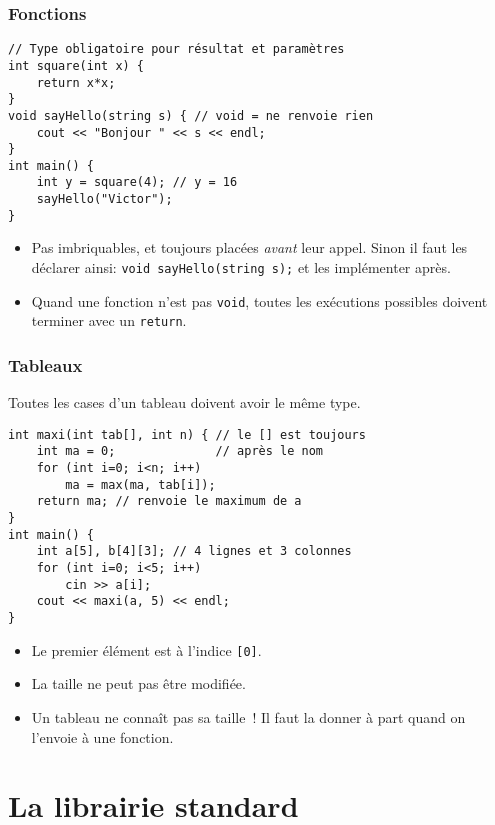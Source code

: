 \documentclass[12pt]{beamer}
\begin{document}
\begin{frame}[fragile]
\frametitle{Fonctions}
\begin{lstlisting}
// Type obligatoire pour résultat et paramètres
int square(int x) {
    return x*x;
}
void sayHello(string s) { // void = ne renvoie rien
    cout << "Bonjour " << s << endl;
}
int main() {
    int y = square(4); // y = 16
    sayHello("Victor");
}
\end{lstlisting}
\begin{itemize}
\item Pas imbriquables, et toujours placées \emph{avant} leur appel. Sinon il faut les déclarer ainsi: \lstinline|void sayHello(string s);| et les implémenter après.
\item Quand une fonction n'est pas \lstinline|void|, toutes les exécutions possibles doivent terminer avec un \lstinline|return|.
\end{itemize}
\end{frame}

\begin{frame}[fragile]
\frametitle{Tableaux}
Toutes les cases d'un tableau doivent avoir le même type.
\begin{lstlisting}
int maxi(int tab[], int n) { // le [] est toujours
    int ma = 0;              // après le nom
    for (int i=0; i<n; i++)
        ma = max(ma, tab[i]);
    return ma; // renvoie le maximum de a
}
int main() {
    int a[5], b[4][3]; // 4 lignes et 3 colonnes
    for (int i=0; i<5; i++)
        cin >> a[i];
    cout << maxi(a, 5) << endl;
}
\end{lstlisting}
\begin{itemize}
\item Le premier élément est à l'indice \lstinline|[0]|.
\item La taille ne peut pas être modifiée.
\item Un tableau ne connaît pas sa taille ! Il faut la donner à part quand on l'envoie à une fonction.
\end{itemize}
\end{frame}


\section{La librairie standard}
\end{document}
